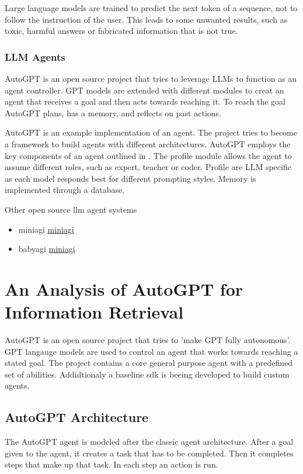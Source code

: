 \documentclass[english, version-2022-01]{uzl-thesis}
\begin{document}
Large language models are trained to predict the next token of a sequence, not to follow the instruction of the user. This leads to some unwanted results, such as toxic, harmful answers or fabricated information that is not true.

\subsection{LLM Agents}

AutoGPT is an open source project that tries to leverage LLMs to function as an agent controller. GPT models are extended with different modules to creat an agent that receives a goal and then acts towards reaching it. To reach the goal AutoGPT plans, has a memory, and reflects on past actions.

AutoGPT is an example implementation of an agent. The project tries to become a framework to build agents with different architectures.
AutoGPT employs the key components of an agent outlined in \cite{Wang2023}. The profile module allows the agent to assume different roles, such as expert, teacher or coder. Profile are LLM specific as each model responds best for different prompting styles. Memory is implemented through a database.

Other open source llm agent systems
\begin{itemize}
	\item miniagi \href{}{miniagi}
	\item babyagi \href{https://github.com/yoheinakajima/babyagi}{miniagi}
\end{itemize}

\chapter{An Analysis of AutoGPT for Information Retrieval}

AutoGPT is an open source project that tries to 'make GPT fully autonomous'. GPT langauge models are used to control an agent that works towards reaching a stated goal. The project contains a core general purpose agent with a predefined set of abilities. Addidtionaly a baseline sdk is beeing developed to build custom agents.

\section{AutoGPT Architecture}

The AutoGPT agent is modeled after the classic agent architecture. After a goal given to the agent, it creates a task that has to be completed. Then it completes steps that make up that task. In each step an action is run.
\end{document}

